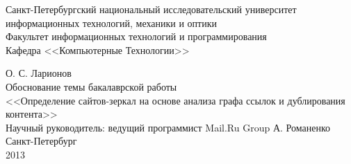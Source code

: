 \documentclass[a4paper, 12pt, titlepage]{article}
\begin{document}
\begin{titlepage}
\begin{center}
Санкт-Петербургский национальный исследовательский университет\\
информационных технологий, механики и оптики\\
Факультет информационных технологий и программирования\\
Кафедра <<Компьютерные Технологии>>

\vspace{10em}
\large О. С. Ларионов\\
\vspace{3em}
\Large Обоснование темы бакалаврской работы\\
<<Определение сайтов-зеркал на основе анализа графа ссылок и дублирования контента>>\\
\vspace{3em}
\large Научный руководитель: ведущий программист Mail.Ru Group А. Романенко\\

\vfill
\normalsize Санкт-Петербург\\
2013
\end{center}
\end{titlepage}
\pagestyle{plain}




\end{document}
